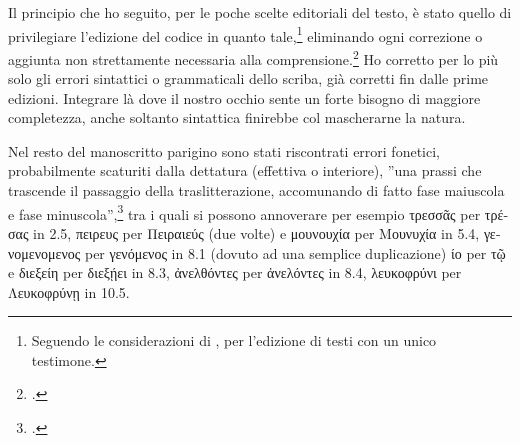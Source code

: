 Il principio che ho seguito, per le poche scelte
editoriali del testo, è stato quello di privilegiare
l'edizione del codice in quanto
tale,\footnote{Seguendo le
considerazioni di \cite[21 e 30]{Cortassa1990}, per
l'edizione di testi con un unico
testimone.} eliminando ogni correzione o aggiunta
non strettamente necessaria alla comprensione.\footnote{\cite[25]{Cortassa1990}.} Ho corretto per lo più solo gli errori
sintattici o grammaticali dello scriba, già corretti fin dalle prime edizioni. Integrare là dove
il nostro occhio sente un forte bisogno di maggiore completezza, anche
soltanto sintattica finirebbe col mascherarne la natura.

Nel resto del manoscritto
parigino sono stati riscontrati errori fonetici, probabilmente scaturiti
dalla dettatura (effettiva o interiore), ''una prassi che trascende il
passaggio della traslitterazione, accomunando di fatto fase maiuscola e fase
minuscola'',\footnote{\cite[108]{Ronconi2003}.} tra i
quali  si possono annoverare per esempio \textgreek{τρεσσᾶς} per 
\textgreek{τρέσας} in 2.5, 
\textgreek{πειρευς} per
\textgreek{Πειραιεύς} (due volte) e
\textgreek{μουνουχία}
per \textgreek{Μουνυχία} in 5.4,
\textgreek{γενομενομενος} per
\textgreek{γενόμενος} in 8.1 (dovuto ad una semplice duplicazione) \textgreek{ίο} per \textgreek{τῷ} e \textgreek{διεξείη} per \textgreek{διεξῄει} in
8.3, \textgreek{ἀνελθόντες} per
\textgreek{ἀνελόντες} in 8.4, \textgreek{λευκοφρύνι} per
\textgreek{Λευκοφρύνῃ} in
10.5.

